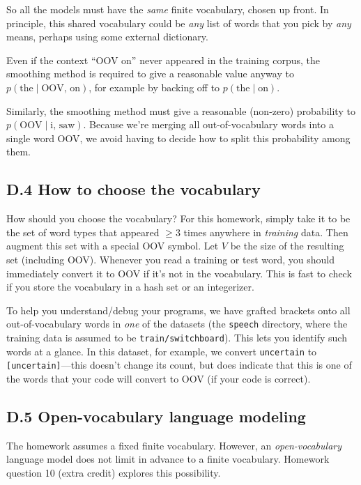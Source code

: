 So all the models must have the \textit{same} finite vocabulary, chosen up front. In principle, this shared vocabulary could be \textit{any} list of words that you pick by \textit{any} means, perhaps using some external dictionary.

Even if the context “OOV on” never appeared in the training corpus, the smoothing method is required to give a reasonable value anyway to $p(\text{the} \mid \text{OOV, on})$, for example by backing off to $p(\text{the} \mid \text{on})$.

Similarly, the smoothing method must give a reasonable (non-zero) probability to $p(\text{OOV} \mid \text{i, saw})$. Because we’re merging all out-of-vocabulary words into a single word OOV, we avoid having to decide how to split this probability among them.

\subsection*{D.4 How to choose the vocabulary}

How should you choose the vocabulary? For this homework, simply take it to be the set of word types that appeared $\geq 3$ times anywhere in \textit{training} data. Then augment this set with a special OOV symbol. Let $V$ be the size of the resulting set (including OOV). Whenever you read a training or test word, you should immediately convert it to OOV if it’s not in the vocabulary. This is fast to check if you store the vocabulary in a hash set or an integerizer.

To help you understand/debug your programs, we have grafted brackets onto all out-of-vocabulary words in \textit{one} of the datasets (the \texttt{speech} directory, where the training data is assumed to be \texttt{train/switchboard}). This lets you identify such words at a glance. In this dataset, for example, we convert \texttt{uncertain} to \texttt{[uncertain]}—this doesn’t change its count, but does indicate that this is one of the words that your code will convert to OOV (if your code is correct).

\subsection*{D.5 Open-vocabulary language modeling}

The homework assumes a fixed finite vocabulary. However, an \textit{open-vocabulary} language model does not limit in advance to a finite vocabulary. Homework question 10 (extra credit) explores this possibility.


